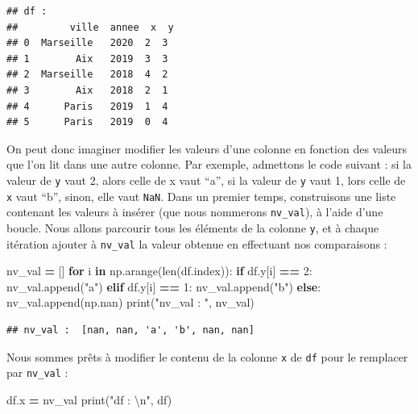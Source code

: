 \documentclass[
  12pt,
]{book}
\newenvironment{Shaded}{\begin{snugshade}}{\end{snugshade}}
\newcommand{\BuiltInTok}[1]{#1}
\newcommand{\CharTok}[1]{\textcolor[rgb]{0.31,0.60,0.02}{#1}}
\newcommand{\ControlFlowTok}[1]{\textcolor[rgb]{0.13,0.29,0.53}{\textbf{#1}}}
\newcommand{\DecValTok}[1]{\textcolor[rgb]{0.00,0.00,0.81}{#1}}
\newcommand{\KeywordTok}[1]{\textcolor[rgb]{0.13,0.29,0.53}{\textbf{#1}}}
\newcommand{\NormalTok}[1]{#1}
\newcommand{\OperatorTok}[1]{\textcolor[rgb]{0.81,0.36,0.00}{\textbf{#1}}}
\newcommand{\StringTok}[1]{\textcolor[rgb]{0.31,0.60,0.02}{#1}}
\numberwithin{equation}{section}
\numberwithin{countremarque}{section}
\begin{document}
\begin{lstlisting}
## df : 
##         ville  annee  x  y
## 0  Marseille   2020  2  3
## 1        Aix   2019  3  3
## 2  Marseille   2018  4  2
## 3        Aix   2018  2  1
## 4      Paris   2019  1  4
## 5      Paris   2019  0  4
\end{lstlisting}

On peut donc imaginer modifier les valeurs d'une colonne en fonction des valeurs que l'on lit dans une autre colonne. Par exemple, admettons le code suivant : si la valeur de \texttt{y} vaut 2, alors celle de x vaut ``a'', si la valeur de \texttt{y} vaut 1, lors celle de \texttt{x} vaut ``b'', sinon, elle vaut \texttt{NaN}. Dans un premier temps, construisons une liste contenant les valeurs à insérer (que nous nommerons \texttt{nv\_val}), à l'aide d'une boucle. Nous allons parcourir tous les éléments de la colonne \texttt{y}, et à chaque itération ajouter à \texttt{nv\_val} la valeur obtenue en effectuant nos comparaisons :

\begin{Shaded}
\begin{Highlighting}[]
\NormalTok{nv\_val }\OperatorTok{=}\NormalTok{ []}
\ControlFlowTok{for}\NormalTok{ i }\KeywordTok{in}\NormalTok{ np.arange(}\BuiltInTok{len}\NormalTok{(df.index)):}
        \ControlFlowTok{if}\NormalTok{ df.y[i] }\OperatorTok{==} \DecValTok{2}\NormalTok{:}
\NormalTok{            nv\_val.append(}\StringTok{"a"}\NormalTok{)}
        \ControlFlowTok{elif}\NormalTok{ df.y[i] }\OperatorTok{==} \DecValTok{1}\NormalTok{:}
\NormalTok{            nv\_val.append(}\StringTok{"b"}\NormalTok{)}
        \ControlFlowTok{else}\NormalTok{:}
\NormalTok{            nv\_val.append(np.nan)}
\BuiltInTok{print}\NormalTok{(}\StringTok{"nv\_val : "}\NormalTok{, nv\_val)}
\end{Highlighting}
\end{Shaded}

\begin{lstlisting}
## nv_val :  [nan, nan, 'a', 'b', nan, nan]
\end{lstlisting}

Nous sommes prêts à modifier le contenu de la colonne \texttt{x} de \texttt{df} pour le remplacer par \texttt{nv\_val} :

\begin{Shaded}
\begin{Highlighting}[]
\NormalTok{df.x }\OperatorTok{=}\NormalTok{ nv\_val}
\BuiltInTok{print}\NormalTok{(}\StringTok{"df : }\CharTok{\textbackslash{}n}\StringTok{"}\NormalTok{, df)}
\end{Highlighting}
\end{Shaded}
\end{document}
